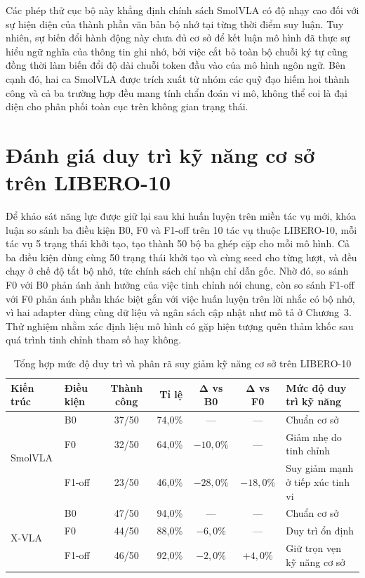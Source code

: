 Các phép thử cục bộ này khẳng định chính sách SmolVLA có độ nhạy cao đối với sự hiện diện của thành phần văn bản bộ nhớ tại từng thời điểm suy luận. Tuy nhiên, sự biến đổi hành động này chưa đủ cơ sở để kết luận mô hình đã thực sự hiểu ngữ nghĩa của thông tin ghi nhớ, bởi việc cắt bỏ toàn bộ chuỗi ký tự cũng đồng thời làm biến đổi độ dài chuỗi token đầu vào của mô hình ngôn ngữ. Bên cạnh đó, hai ca SmolVLA được trích xuất từ nhóm các quỹ đạo hiếm hoi thành công và cả ba trường hợp đều mang tính chẩn đoán vi mô, không thể coi là đại diện cho phân phối toàn cục trên không gian trạng thái.

\section{Đánh giá duy trì kỹ năng cơ sở trên LIBERO-10}
\label{sec:e6-retention}

Để khảo sát năng lực được giữ lại sau khi huấn luyện trên miền tác vụ mới, khóa luận so sánh ba điều kiện B0, F0 và F1-off trên 10 tác vụ thuộc LIBERO-10, mỗi tác vụ 5 trạng thái khởi tạo, tạo thành 50 bộ ba ghép cặp cho mỗi mô hình. Cả ba điều kiện dùng cùng 50 trạng thái khởi tạo và cùng seed cho từng lượt, và đều chạy ở chế độ tắt bộ nhớ, tức chính sách chỉ nhận chỉ dẫn gốc. Nhờ đó, so sánh F0 với B0 phản ánh ảnh hưởng của việc tinh chỉnh nói chung, còn so sánh F1-off với F0 phản ánh phần khác biệt gắn với việc huấn luyện trên lời nhắc có bộ nhớ, vì hai adapter dùng cùng dữ liệu và ngân sách cập nhật như mô tả ở Chương~3. Thử nghiệm nhằm xác định liệu mô hình có gặp hiện tượng quên thảm khốc sau quá trình tinh chỉnh tham số hay không.

\begin{table}[htbp]
\centering\small
\caption{Tổng hợp mức độ duy trì và phân rã suy giảm kỹ năng cơ sở trên LIBERO-10}
\label{tab:e6-retention-combined}
\label{tab:e6-retention-results}
\label{tab:xvla-e6-results}
\setlength{\tabcolsep}{4pt}
\begin{tabular}{|l|l|c|r|c|c|>{\raggedright\arraybackslash}p{4.2cm}|}
\hline
\textbf{Kiến trúc} & \textbf{Điều kiện} & \textbf{Thành công} & \textbf{Tỉ lệ} & $\mathbf{\Delta}$ \textbf{vs B0} & $\mathbf{\Delta}$ \textbf{vs F0} & \textbf{Mức độ duy trì kỹ năng} \\ \hline
\multirow{3}{*}{SmolVLA} & B0     & 37/50 & 74{,}0\% & —        & —        & Chuẩn cơ sở \\ \cline{2-7}
        & F0     & 32/50 & 64{,}0\% & $-10{,}0\%$ & —        & Giảm nhẹ do tinh chỉnh \\ \cline{2-7}
        & F1-off & 23/50 & 46{,}0\% & $-28{,}0\%$ & $-18{,}0\%$ & Suy giảm mạnh ở tiếp xúc tinh vi \\ \hline
\multirow{3}{*}{X-VLA}   & B0     & 47/50 & 94{,}0\% & —        & —        & Chuẩn cơ sở \\ \cline{2-7}
        & F0     & 44/50 & 88{,}0\% & $-6{,}0\%$  & —        & Duy trì ổn định \\ \cline{2-7}
        & F1-off & 46/50 & 92{,}0\% & $-2{,}0\%$  & $+4{,}0\%$  & Giữ trọn vẹn kỹ năng cơ sở \\ \hline
\end{tabular}
\end{table}

